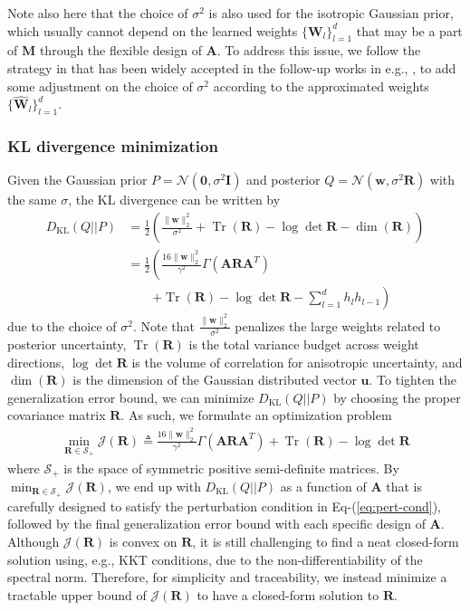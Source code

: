 \documentclass[journal]{IEEEtran} %
\def\eqref#1{Eq-(\ref{#1})}
\newcommand{\nn}{\nonumber}
\def\vzero{{\bm{0}}}
\def\vu{{\bm{u}}}
\def\vw{{\bm{w}}}
\def\mA{{\bm{A}}}
\def\mI{{\bm{I}}}
\def\mM{{\bm{M}}}
\def\mR{{\bm{R}}}
\def\mW{{\bm{W}}}
\def\gJ{{\mathcal{J}}}
\def\gN{{\mathcal{N}}}
\def\gS{{\mathcal{S}}}
\newcommand{\KL}{D_{\mathrm{KL}}}
\newcommand{\Norm}[1]{\|#1\|}
\DeclareMathOperator{\Tr}{Tr}
\begin{document}
Note also here that the choice of $\sigma^2$ is also used for the isotropic Gaussian prior, which usually cannot depend on the learned weights $\{{\mW}_l\}_{l=1}^d$ that may be a part of $\mM$ through the flexible design of $\mA$. To address this issue, we follow the strategy in \cite{neyshabur2018pac} that has been widely accepted in the follow-up works in e.g., \cite{xiao2023pac,jin2022enhancing,11027475,liao2020pac}, to add some adjustment on the choice of $\sigma^2$ according to the approximated weights $\{\hat{\mW}_l\}_{l=1}^d$. 



\subsubsection{KL divergence minimization} Given the Gaussian prior $P=\gN(\vzero,\sigma^2\mI)$ and posterior $Q=\gN(\vw, \sigma^2 \mR)$ with the same $\sigma$, the KL divergence can be written by \cite{pardo2018statistical}
\begin{align}
    \KL(Q||P) &= \frac{1}{2} \left( \frac{\Norm{\vw}_2^2}{\sigma^2} + \Tr(\mR) - \log \det \mR - \dim (\mR) \right) \nn \\
    &= \frac{1}{2} \left( \frac{16\Norm{\vw}_2^2}{\gamma^2} \Gamma(\mA \mR \mA^T) \right. \nn \\
    & \qquad  \left. + \Tr(\mR) - \log \det \mR - \sum_{l=1}^d h_l h_{l-1} \right)
\end{align}
due to the choice of $\sigma^2$.
Note that $\frac{\Norm{\vw}_2^2}{\sigma^2}$ penalizes the large weights related to posterior uncertainty, $\Tr(\mR)$ is the total variance budget across weight directions, $\log \det \mR$ is the volume of correlation for anisotropic uncertainty, and $\dim(\mR)$ is the dimension of the Gaussian distributed vector $\vu$.
To tighten the generalization error bound, we can minimize $\KL(Q||P)$ by choosing the proper covariance matrix $\mR$. As such, we formulate an optimization problem
\begin{align}
    \min_{\mR \in \gS_{+}} \gJ(\mR) \triangleq \frac{16\Norm{\vw}_2^2}{\gamma^2} \Gamma(\mA \mR \mA^T) + \Tr(\mR) - \log \det \mR
\end{align}
where $\gS_{+}$ is the space of symmetric positive semi-definite matrices. By $\min_{\mR \in \gS_{+}} \gJ(\mR)$, we end up with $\KL(Q||P)$ as a function of $\mA$ that is carefully designed to satisfy the perturbation condition in \eqref{eq:pert-cond}, followed by the final generalization error bound with each specific design of $\mA$. Although $\gJ(\mR)$ is convex on $\mR$, it is still challenging to find a neat closed-form solution using, e.g., KKT conditions, due to the non-differentiability of the spectral norm. Therefore, for simplicity and traceability, we instead minimize a tractable upper bound of $\gJ(\mR)$ to have a closed-form solution to $\mR$.
\end{document}

